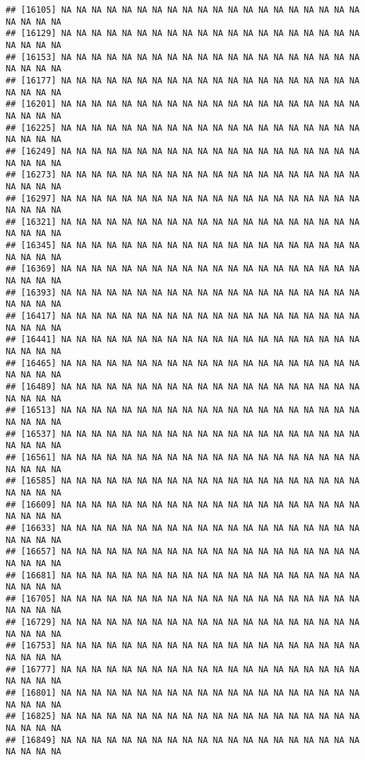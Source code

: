 \documentclass[
]{article}
\begin{document}
\begin{verbatim}
## [16105] NA NA NA NA NA NA NA NA NA NA NA NA NA NA NA NA NA NA NA NA NA NA NA NA
## [16129] NA NA NA NA NA NA NA NA NA NA NA NA NA NA NA NA NA NA NA NA NA NA NA NA
## [16153] NA NA NA NA NA NA NA NA NA NA NA NA NA NA NA NA NA NA NA NA NA NA NA NA
## [16177] NA NA NA NA NA NA NA NA NA NA NA NA NA NA NA NA NA NA NA NA NA NA NA NA
## [16201] NA NA NA NA NA NA NA NA NA NA NA NA NA NA NA NA NA NA NA NA NA NA NA NA
## [16225] NA NA NA NA NA NA NA NA NA NA NA NA NA NA NA NA NA NA NA NA NA NA NA NA
## [16249] NA NA NA NA NA NA NA NA NA NA NA NA NA NA NA NA NA NA NA NA NA NA NA NA
## [16273] NA NA NA NA NA NA NA NA NA NA NA NA NA NA NA NA NA NA NA NA NA NA NA NA
## [16297] NA NA NA NA NA NA NA NA NA NA NA NA NA NA NA NA NA NA NA NA NA NA NA NA
## [16321] NA NA NA NA NA NA NA NA NA NA NA NA NA NA NA NA NA NA NA NA NA NA NA NA
## [16345] NA NA NA NA NA NA NA NA NA NA NA NA NA NA NA NA NA NA NA NA NA NA NA NA
## [16369] NA NA NA NA NA NA NA NA NA NA NA NA NA NA NA NA NA NA NA NA NA NA NA NA
## [16393] NA NA NA NA NA NA NA NA NA NA NA NA NA NA NA NA NA NA NA NA NA NA NA NA
## [16417] NA NA NA NA NA NA NA NA NA NA NA NA NA NA NA NA NA NA NA NA NA NA NA NA
## [16441] NA NA NA NA NA NA NA NA NA NA NA NA NA NA NA NA NA NA NA NA NA NA NA NA
## [16465] NA NA NA NA NA NA NA NA NA NA NA NA NA NA NA NA NA NA NA NA NA NA NA NA
## [16489] NA NA NA NA NA NA NA NA NA NA NA NA NA NA NA NA NA NA NA NA NA NA NA NA
## [16513] NA NA NA NA NA NA NA NA NA NA NA NA NA NA NA NA NA NA NA NA NA NA NA NA
## [16537] NA NA NA NA NA NA NA NA NA NA NA NA NA NA NA NA NA NA NA NA NA NA NA NA
## [16561] NA NA NA NA NA NA NA NA NA NA NA NA NA NA NA NA NA NA NA NA NA NA NA NA
## [16585] NA NA NA NA NA NA NA NA NA NA NA NA NA NA NA NA NA NA NA NA NA NA NA NA
## [16609] NA NA NA NA NA NA NA NA NA NA NA NA NA NA NA NA NA NA NA NA NA NA NA NA
## [16633] NA NA NA NA NA NA NA NA NA NA NA NA NA NA NA NA NA NA NA NA NA NA NA NA
## [16657] NA NA NA NA NA NA NA NA NA NA NA NA NA NA NA NA NA NA NA NA NA NA NA NA
## [16681] NA NA NA NA NA NA NA NA NA NA NA NA NA NA NA NA NA NA NA NA NA NA NA NA
## [16705] NA NA NA NA NA NA NA NA NA NA NA NA NA NA NA NA NA NA NA NA NA NA NA NA
## [16729] NA NA NA NA NA NA NA NA NA NA NA NA NA NA NA NA NA NA NA NA NA NA NA NA
## [16753] NA NA NA NA NA NA NA NA NA NA NA NA NA NA NA NA NA NA NA NA NA NA NA NA
## [16777] NA NA NA NA NA NA NA NA NA NA NA NA NA NA NA NA NA NA NA NA NA NA NA NA
## [16801] NA NA NA NA NA NA NA NA NA NA NA NA NA NA NA NA NA NA NA NA NA NA NA NA
## [16825] NA NA NA NA NA NA NA NA NA NA NA NA NA NA NA NA NA NA NA NA NA NA NA NA
## [16849] NA NA NA NA NA NA NA NA NA NA NA NA NA NA NA NA NA NA NA NA NA NA NA NA

\end{verbatim}
\end{document}
